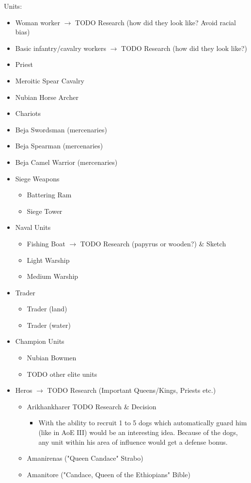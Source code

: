 \documentclass[a4paper,12pt]{scrreprt}
\begin{document}
Units:

\begin{itemize}
	\item Woman worker $\rightarrow$ TODO Research (how did they look like? Avoid racial bias)
	\item Basic infantry/cavalry workers $\rightarrow$ TODO Research (how did they look like?)
	\item Priest
	\item Meroitic Spear Cavalry
	\item Nubian Horse Archer
	\item Chariots
	\item Beja Swordsman (mercenaries)
	\item Beja Spearman (mercenaries)
	\item Beja Camel Warrior (mercenaries)
	\item Siege Weapons
	\begin{itemize}
		\item Battering Ram
		\item Siege Tower
	\end{itemize}
	\item Naval Units
	\begin{itemize}
		\item Fishing Boat $\rightarrow$ TODO Research (papyrus or wooden?) \& Sketch
		\item Light Warship
		\item Medium Warship
	\end{itemize}
	\item Trader
	\begin{itemize}
		\item Trader (land)
		\item Trader (water)
	\end{itemize}
	\item Champion Units
	\begin{itemize}
		\item Nubian Bowmen
		\item TODO other elite units
	\end{itemize}
	\item Heros $\rightarrow$ TODO Research (Important Queens/Kings, Priests etc.)
	\begin{itemize}
		\item Arikhankharer TODO Research \& Decision
		\begin{itemize}
			\item With the ability to recruit 1 to 5 dogs which automatically guard him (like in AoE III) would be an interesting idea. Because of the dogs, any unit within his area of influence would get a defense bonus.  
		\end{itemize}
		\item Amanirenas ("Queen Candace" Strabo)
		\item Amanitore ("Candace, Queen of the Ethiopians" Bible)
	\end{itemize}
\end{itemize}
\end{document}
